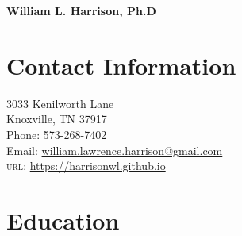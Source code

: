 \documentclass[12pt]{article} %
\begin{document}


{\LARGE\bfseries William L. Harrison, Ph.D} %
\medskip %

\section*{Contact Information}

3033 Kenilworth Lane
\\
Knoxville, TN 37917
\\
Phone: 573-268-7402
\\ 
Email: \href{mailto:william.lawrence.harrison@gmail.com}{william.lawrence.harrison@gmail.com}
\\
\textsc{url}: \href{https://harrisonwl.github.io}{https://harrisonwl.github.io}


\section*{Education}
\end{document}
